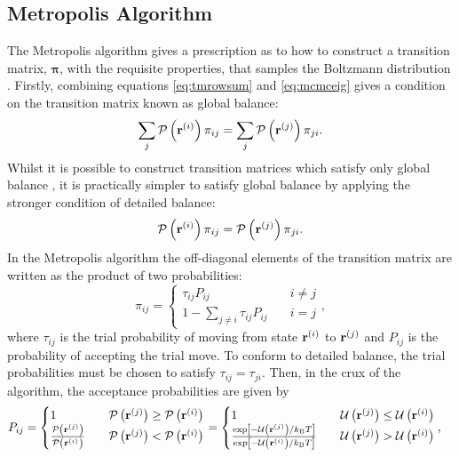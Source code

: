 \subsection{Metropolis Algorithm}
\label{ssec:metropolis}

The Metropolis algorithm gives a prescription as to how to construct a transition matrix, $\bm{\pi}$, with the requisite properties, that samples the Boltzmann distribution \cite{Metropolis1953}.
Firstly, combining equations \eqref{eq:tmrowsum} and \eqref{eq:mcmceig} gives a condition on the transition matrix known as global balance:
\begin{equation}
	\sum_j \mathcal{P}\left(\mathbf{r}^{\left(i\right)}\right)\pi_{ij} = \sum_j \mathcal{P}\left(\mathbf{r}^{\left(j\right)}\right)\pi_{ji}.
\end{equation} 
Whilst it is possible to construct transition matrices which satisfy only global balance \cite{Manousiouthakis1999,Suwa2010,Michel2014}, it is practically simpler to satisfy global balance by applying the stronger condition of detailed balance:
\begin{equation}
	\mathcal{P}\left(\mathbf{r}^{\left(i\right)}\right)\pi_{ij} = \mathcal{P}\left(\mathbf{r}^{\left(j\right)}\right)\pi_{ji}.
\end{equation}
In the Metropolis algorithm the off\--diagonal elements of the transition matrix are written as the product of two probabilities: 
\begin{equation}
	\pi_{ij} = \begin{cases} 
		\tau_{ij}P_{ij} \quad & i\neq j \\
		1-\sum\limits_{j\neq i}\tau_{ij}P_{ij} \quad & i=j
	\end{cases},
\end{equation}
where $\tau_{ij}$ is the trial probability of moving from state $\mathbf{r}^{\left(i\right)}$ to $\mathbf{r}^{\left(j\right)}$ and $P_{ij}$ is the probability of accepting the trial move.
To conform to detailed balance, the trial probabilities must be chosen to satisfy $\tau_{ij}=\tau_{ji}$.
Then, in the crux of the algorithm, the acceptance probabilities are given by
\begin{align}
	 P_{ij}&=\begin{cases}
	 	1 \quad &\mathcal{P}\left(\vrc{j}\right)\geq \mathcal{P}\left(\vrc{i}\right) \\
	 	\frac{\mathcal{P}\left(\vrc{j}\right)}{\mathcal{P}\left(\vrc{i}\right)} \quad & \mathcal{P}\left(\vrc{j}\right)< \mathcal{P}\left(\vrc{i}\right)
	 \end{cases}%
	 =\begin{cases}
	 	1 \quad &\mathcal{U}\left(\vrc{j}\right)\leq \mathcal{U}\left(\vrc{i}\right) \\
	 	\frac{\exp\left[-\mathcal{U}\left(\vrc{j}\right)/\kb T\right]}{\exp\left[-\mathcal{U}\left(\vrc{i}\right)/\kb T\right]} \quad & \mathcal{U}\left(\vrc{j}\right)>\mathcal{U}\left(\vrc{i}\right)
	 \end{cases}, \nonumber
\end{align}
